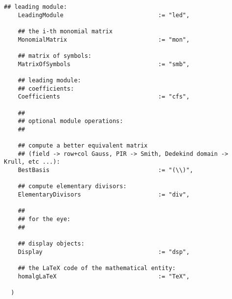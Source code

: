 \documentclass[a4paper,11pt]{report}
\begin{document}
{{{\begin{Verbatim}[fontsize=\small,frame=single,label=Code]
    ## leading module:
    LeadingModule                           := "led",
    
    ## the i-th monomial matrix
    MonomialMatrix                          := "mon",
    
    ## matrix of symbols:
    MatrixOfSymbols                         := "smb",
    
    ## leading module:
    ## coefficients:
    Coefficients                            := "cfs",
    
    ##
    ## optional module operations:
    ##
    
    ## compute a better equivalent matrix
    ## (field -> row+col Gauss, PIR -> Smith, Dedekind domain -> Krull, etc ...):
    BestBasis                               := "(\\)",
    
    ## compute elementary divisors:
    ElementaryDivisors                      := "div",
    
    ##
    ## for the eye:
    ##
    
    ## display objects:
    Display                                 := "dsp",
    
    ## the LaTeX code of the mathematical entity:
    homalgLaTeX                             := "TeX",
    
  )
\end{Verbatim}
 }

 }

  }

   
\end{document}

